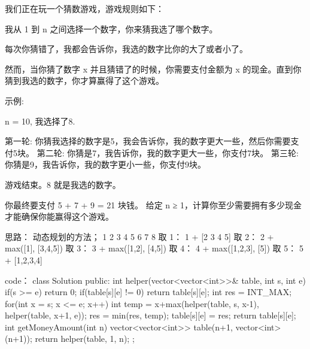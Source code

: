 我们正在玩一个猜数游戏，游戏规则如下：

我从 1 到 n 之间选择一个数字，你来猜我选了哪个数字。

每次你猜错了，我都会告诉你，我选的数字比你的大了或者小了。

然而，当你猜了数字 x 并且猜错了的时候，你需要支付金额为 x 的现金。直到你猜到我选的数字，你才算赢得了这个游戏。

示例:

n = 10, 我选择了8.

第一轮: 你猜我选择的数字是5，我会告诉你，我的数字更大一些，然后你需要支付5块。
第二轮: 你猜是7，我告诉你，我的数字更大一些，你支付7块。
第三轮: 你猜是9，我告诉你，我的数字更小一些，你支付9块。

游戏结束。8 就是我选的数字。

你最终要支付 5 + 7 + 9 = 21 块钱。
给定 n ≥ 1，计算你至少需要拥有多少现金才能确保你能赢得这个游戏。






















思路：
动态规划的方法；
1 2 3 4 5 6 7 8
取 1： 1 + [2 3 4 5]
取 2： 2 + max([1], [3,4,5])
取 3： 3 + max([1,2], [4,5]) 
取 4： 4 + max([1,2,3], [5])
取 5： 5 + [1,2,3,4]





















code：
class Solution {
public:
    int helper(vector<vector<int>>& table, int s, int e)
    {
        if(s >= e) return 0;
        if(table[s][e] != 0) return table[s][e];
        int res = INT_MAX;
        for(int x = s; x <= e; x++)
        {
            int temp = x+max(helper(table, s, x-1), helper(table, x+1, e));
            res = min(res, temp);
        }
        table[s][e] = res;
        return table[s][e];
    }
    int getMoneyAmount(int n) {
        vector<vector<int>> table(n+1, vector<int>(n+1));
        return helper(table, 1, n);
    }
};